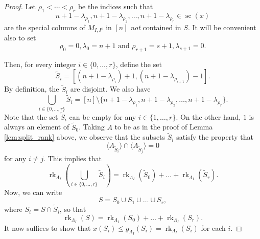 \documentclass[12pt]{amsart}
\DeclareMathOperator{\rk}{rk}
\DeclareMathOperator{\SC}{sc}
\begin{document}
\begin{proof}
    Let $\rho_1<\cdots<\rho_r$ be the indices such that
\begin{equation*}
    n +1 -\lambda_{\rho_1},n +1 -\lambda_{\rho_2}, \ldots,n +1 -\lambda_{\rho_r} \in \SC(x)
\end{equation*}
are the special columns of $M_{I,I^c}$ in $[n]$ \emph{not} contained in $S$. It will be convenient also to set
\begin{equation*}
    \rho_0=0,\lambda_0=n+1\text{ and }\rho_{r+1}=s+1,\lambda_{s+1}=0.
\end{equation*}

Then, for every integer $i \in \{0, \ldots, r\}$, define the set
\begin{equation*}
    \widetilde{S}_i =[(n+1-\lambda_{\rho_{i}})+1, (n+1-\lambda_{\rho_{i+1}})-1].
\end{equation*}
By definition, the $\widetilde{S}_i$ are disjoint. We also have 
\begin{equation*}
    \bigcup_{i \in \{0, \ldots, r\}} \widetilde{S}_i = [n] \setminus \{n +1 -\lambda_{\rho_1}, n +1 -\lambda_{\rho_2}, \ldots, n +1 -\lambda_{\rho_r}\}.
\end{equation*}
Note that the set $\widetilde{S}_i$ can be empty for any $i \in \{1, \ldots, r\}$. On the other hand, $1$ is always an element of $\widetilde{S}_0$. Taking $A$ to be as in the proof of Lemma \ref{lem:split_rank} above, we observe that the subsets $\widetilde{S}_i$ satisfy the property that 
\begin{equation*}
    \langle A_{\widetilde{S}_i}\rangle \cap \langle A_{\widetilde{S}_j}\rangle = 0
\end{equation*}
for any $i \neq j$. This implies that 
\begin{equation*}
    \rk_{\Lambda_I}\left(\bigcup_{i \in \{0, \ldots, r\}} \widetilde{S}_i\right) = \rk_{\Lambda_I}(\widetilde{S}_0) + \ldots + \rk_{\Lambda_I}(\widetilde{S}_r).
\end{equation*}
Now, we can write
\begin{equation*}
    S = S_0 \cup S_1 \cup \ldots \cup S_r,
\end{equation*}
where $S_i=S\cap \widetilde{S}_i$, so that
\begin{equation*}
    \rk_{\Lambda_I}(S) = \rk_{\Lambda_I}(S_0) + \ldots + \rk_{\Lambda_I}(S_r).
\end{equation*}
It now suffices to show that $x(S_i)\le g_{\Lambda_I}(S_i)= \rk_{\Lambda_I}(S_i)$ for each $i$. 


\end{proof}
\end{document}
